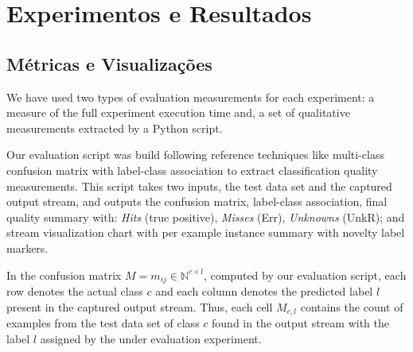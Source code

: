 


% 
% 

\chapter{Experimentos e Resultados}\label{cha:results}


% 

\section{Métricas e Visualizações}
\label{sec:experiments}

We have used two types of evaluation measurements for each experiment:
a measure of the full experiment execution time
and, a set of qualitative measurements %
extracted by a Python script.

Our evaluation script was build following reference techniques like
multi-class confusion matrix with label-class association \cite{Faria2016minas}
to extract classification quality measurements.
This script takes two inputs, the test data set and the captured output stream,
and outputs the confusion matrix, label-class association,
final quality summary with:
\emph{Hits} (true positive), \emph{Misses} (Err), \emph{Unknowns} (UnkR); and
stream visualization chart with per example instance summary with novelty label markers.
% 

In the confusion matrix $M = m_{ij} \in \mathbb{N} ^{c \times{} l}$, computed by
our evaluation script, each row denotes %
the actual class $c$ and each column denotes the predicted label $l$ present in
the captured output stream.
Thus, each cell $M_{c, l}$ contains the count of examples from the test data set
of class $c$ found in the output stream with the label $l$ assigned by the under
evaluation experiment.

